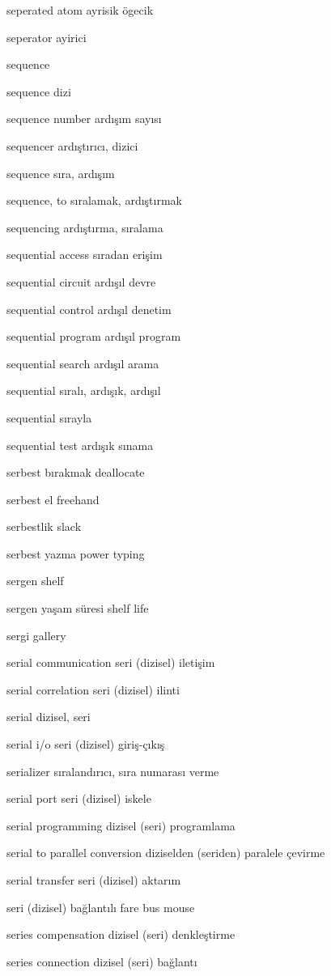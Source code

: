 \documentclass[12pt,fleqn]{article}\usepackage{../../common}
\begin{document}
seperated atom ayrisik ögecik

seperator ayirici

sequence

sequence dizi

sequence number ardışım sayısı

sequencer ardıştırıcı, dizici

sequence sıra, ardışım

sequence, to sıralamak, ardıştırmak

sequencing ardıştırma, sıralama

sequential access sıradan erişim

sequential circuit ardışıl devre

sequential control ardışıl denetim

sequential program ardışıl program

sequential search ardışıl arama

sequential sıralı, ardışık, ardışıl

sequential sırayla

sequential test ardışık sınama

serbest bırakmak deallocate

serbest el freehand

serbestlik slack

serbest yazma power typing

sergen shelf

sergen yaşam süresi shelf life

sergi gallery

serial communication seri (dizisel) iletişim

serial correlation seri (dizisel) ilinti

serial dizisel, seri

serial i/o seri (dizisel) giriş-çıkış

serializer sıralandırıcı, sıra numarası verme

serial port seri (dizisel) iskele

serial programming dizisel (seri) programlama

serial to parallel conversion diziselden (seriden) paralele çevirme

serial transfer seri (dizisel) aktarım

seri (dizisel) bağlantılı fare bus mouse

series compensation dizisel (seri) denkleştirme

series connection dizisel (seri) bağlantı
\end{document}
